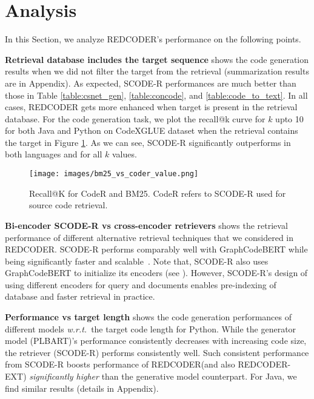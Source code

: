 \documentclass[11pt]{article}
\newcommand{\tool}{{REDCODER}\xspace}
\newcommand{\toolext}{{REDCODER-EXT}\xspace}
\newcommand{\coder}{SCODE-R\xspace}
\newcommand{\wrt}{\textit{w.r.t.}~}
\begin{document}
     \section{Analysis}
\label{sec:analysis}
In this Section, we analyze REDCODER's performance on the following points.

\smallskip\noindent\textbf{Retrieval database includes the target sequence\hspace{0.5em}}
 shows the code generation  results when we did not filter the target from the retrieval (summarization results are in Appendix). As expected, \coder performances are much  better than those in Table \ref{table:csnet_gen}, \ref{table:concode}, and \ref{table:code_to_text}. In all cases, \tool gets more enhanced when target is present in the retrieval database. 
For the code generation task, we plot the recall@k curve for $k$ upto 10 for both Java and Python on CodeXGLUE dataset when the retrieval contains the target in Figure \ref{fig:recall-bm25-coder}. As we can see,  \coder significantly outperforms in both languages and for all $k$ values.


\begin{figure}[t]
\centering
\texttt{[image: images/bm25\_vs\_coder\_value.png]}
\caption{ Recall@K for  CodeR and BM25. CodeR refers to \coder used for source code retrieval.} 
\vspace{-2mm}
\label{fig:recall-bm25-coder}
\end{figure}






\smallskip\noindent\textbf{Bi-encoder \coder vs cross-encoder retrievers\hspace{0.5em}}
 shows the retrieval performance of different alternative retrieval techniques that we considered in \tool. \coder performs comparably well with GraphCodeBERT while being significantly faster and scalable~\cite{Humeau2020Poly-encoders:}. Note that, \coder also uses GraphCodeBERT to initialize its encoders (see ). However, \coder's design of using different encoders for query and documents enables pre-indexing of database and faster retrieval in practice.  





\smallskip\noindent\textbf{Performance vs target length\hspace{0.5em}}
 shows the code generation performances of different models \wrt the target code length for Python. While the generator model (PLBART)'s performance consistently decreases with increasing code size, the retriever (\coder) performs consistently well. Such consistent performance from \coder boosts performance of \tool (and also \toolext) {\em significantly higher} than the generative model counterpart. For Java, we find similar results (details in Appendix).
\end{document}
